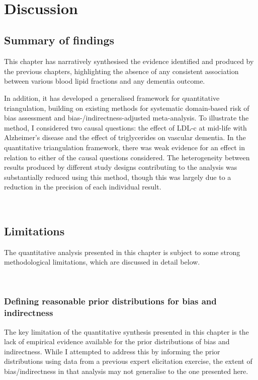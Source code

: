 \documentclass[a4paper, twoside]{templates/ociamthesis}
\begin{document}
~

\hypertarget{discussion-4}{%
\section{Discussion}\label{discussion-4}}

\hypertarget{summary-of-findings-3}{%
\subsection{Summary of findings}\label{summary-of-findings-3}}

This chapter has narratively synthesised the evidence identified and produced by the previous chapters, highlighting the absence of any consistent association between various blood lipid fractions and any dementia outcome.

In addition, it has developed a generalised framework for quantitative triangulation, building on existing methods for systematic domain-based risk of bias assessment and bias-/indirectness-adjusted meta-analysis. To illustrate the method, I considered two causal questions: the effect of LDL-c at mid-life with Alzheimer's disease and the effect of triglycerides on vascular dementia. In the quantitative triangulation framework, there was weak evidence for an effect in relation to either of the causal questions considered. The heterogeneity between results produced by different study designs contributing to the analysis was substantially reduced using this method, though this was largely due to a reduction in the precision of each individual result.

~

\hypertarget{limitations-2}{%
\subsection{Limitations}\label{limitations-2}}

The quantitative analysis presented in this chapter is subject to some strong methodological limitations, which are discussed in detail below.

~

\hypertarget{tri-prior-def}{%
\subsubsection{Defining reasonable prior distributions for bias and indirectness}\label{tri-prior-def}}

The key limitation of the quantitative synthesis presented in this chapter is the lack of empirical evidence available for the prior distributions of bias and indirectness. While I attempted to address this by informing the prior distributions using data from a previous expert elicitation exercise, the extent of bias/indirectness in that analysis may not generalise to the one presented here.
\end{document}
